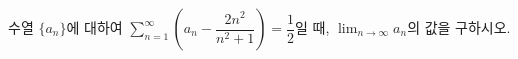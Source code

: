 수열 $\{a_n\}$에 대하여 $\displaystyle\sum_{n=1}^{\infty}\left(a_n-\dfrac{2n^2}{n^2+1}\right)=\dfrac{1}{2}$일 때, $\displaystyle\lim_{n\to\infty} a_n$의 값을 구하시오.
